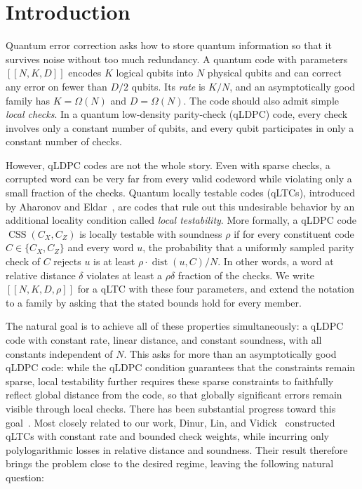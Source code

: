 \documentclass[11pt,letterpaper]{article}
\theoremstyle{definition}
\theoremstyle{remark}
\newcommand{\CSS}{\operatorname{CSS}}
\begin{document}
\clearpage
\begingroup
\small
\tableofcontents
\clearpage
\endgroup
{}
\hypersetup{pageanchor=true}

\section{Introduction} \label{sec:introduction}
Quantum error correction asks how to store quantum information so that
it survives noise without too much redundancy. A quantum code with
parameters $[[N,K,D]]$ encodes $K$ logical qubits into $N$ physical
qubits and can correct any error on fewer than $D/2$ qubits. Its
\emph{rate} is $K/N$, and an asymptotically good family has
$K=\Omega(N)$ and $D=\Omega(N)$. The code should also admit simple \emph{local checks}.
In a quantum low-density parity-check (qLDPC) code, every check involves
only a constant number of qubits, and every qubit participates in only
a constant number of checks.

However, qLDPC codes are not the whole story. Even with sparse checks, a corrupted word can be very far from every valid codeword while violating only a small fraction of the
checks. Quantum locally testable codes (qLTCs), introduced by
Aharonov and Eldar~\cite{AharonovEldar2015}, are codes that rule out this undesirable behavior by an additional locality condition called \emph{local testability}. 
More formally, a qLDPC code $\CSS(C_X,C_Z)$ is locally testable with soundness \(\rho\) if for every constituent code $C \in\{ C_X, C_Z\}$ and every word \(u\), the probability that a uniformly sampled parity check of $C$ rejects \(u\) is at least $\rho\cdot {\operatorname{dist}(u,C)}/{N}$.
In other words, a word at
relative distance $\delta$ violates at least a $\rho\delta$ fraction
of the checks. We write $[[N,K,D,\rho]]$ for a qLTC with these four
parameters, and extend the notation to a family by asking that the
stated bounds hold for every member.

The natural goal is to achieve all of these properties simultaneously: a
qLDPC code
with constant rate, linear distance, and constant soundness, with all
constants independent of $N$. This asks for more than an asymptotically good qLDPC code:
while the qLDPC condition guarantees that the constraints remain sparse,
local testability further requires these sparse constraints to faithfully
reflect global distance from the code, so that globally significant
errors remain visible through local checks.  There has been substantial
progress toward this goal~\cite{PanteleevKalachev2022,LeverrierZemor2022,
QuantumCodesFromHighDimensionalManifolds,
TowardsLocalTestabilityForQuantumCoding,CrossEtAl2024,
TradeoffConstructionsForQLTCs}.  Most closely related to our work,
Dinur, Lin, and Vidick~\cite{DinurLinVidick2024} constructed qLTCs with
constant rate and bounded check weights, while incurring only
polylogarithmic losses in relative distance and soundness. Their result
therefore brings the problem close to the desired regime, leaving the
following natural question:
\end{document}
